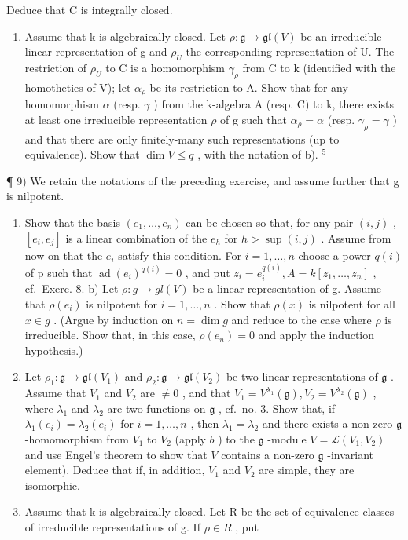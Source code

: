 Deduce that C is integrally closed.

\begin{enumerate}
\def\labelenumi{\alph{enumi})}
\setcounter{enumi}{3}
\tightlist
\item
  Assume that k is algebraically closed. Let \(\rho: \mathfrak{g} \to \mathfrak{gl}(V)\) be an irreducible linear representation of g and \(\rho_{U}\) the corresponding representation of U. The restriction of \(\rho_{U}\) to C is a homomorphism \(\gamma_{\rho}\) from C to k (identified with the homotheties of V); let \(\alpha_{\rho}\) be its restriction to A. Show that for any homomorphism \(\alpha\) (resp. \(\gamma\) ) from the k-algebra A (resp. C) to k, there exists at least one irreducible representation \(\rho\) of g such that \(\alpha_{\rho} = \alpha\) (resp. \(\gamma_{\rho} = \gamma\) ) and that there are only finitely-many such representations (up to equivalence). Show that \(\dim V \leq q\) , with the notation of b). \(^{5}\)
\end{enumerate}

¶ 9) We retain the notations of the preceding exercise, and assume further that g is nilpotent.

\begin{enumerate}
\def\labelenumi{\alph{enumi})}
\item
  Show that the basis \((e_{1},\ldots,e_{n})\) can be chosen so that, for any pair \((i,j)\) , \([e_{i},e_{j}]\) is a linear combination of the \(e_{h}\) for \(h > \sup(i,j)\) . Assume from now on that the \(e_{i}\) satisfy this condition. For \(i=1,\ldots,n\) choose a power \(q(i)\) of p such that \(\operatorname{ad}(e_{i})^{q(i)} = 0\) , and put \(z_{i} = e_{i}^{q(i)}, A = k[z_{1},\ldots,z_{n}]\) , cf.~Exerc. 8. b) Let \(\rho : g \to gl(V)\) be a linear representation of g. Assume that \(\rho(e_{i})\) is nilpotent for \(i = 1,\ldots,n\) . Show that \(\rho(x)\) is nilpotent for all \(x \in g\) . (Argue by induction on \(n = \dim g\) and reduce to the case where \(\rho\) is irreducible. Show that, in this case, \(\rho(e_{n}) = 0\) and apply the induction hypothesis.)
\item
  Let \(\rho_1: \mathfrak{g} \to \mathfrak{gl}(V_1)\) and \(\rho_2: \mathfrak{g} \to \mathfrak{gl}(V_2)\) be two linear representations of \(\mathfrak{g}\) . Assume that \(V_1\) and \(V_2\) are \(\neq 0\) , and that \(V_1 = V^{\lambda_1}(\mathfrak{g}), V_2 = V^{\lambda_2}(\mathfrak{g})\) , where \(\lambda_1\) and \(\lambda_2\) are two functions on \(\mathfrak{g}\) , cf.~no. 3. Show that, if \(\lambda_1(e_i) = \lambda_2(e_i)\) for \(i = 1, \ldots, n\) , then \(\lambda_1 = \lambda_2\) and there exists a non-zero \(\mathfrak{g}\) -homomorphism from \(V_1\) to \(V_2\) (apply \(b\) ) to the \(\mathfrak{g}\) -module \(V = \mathcal{L}(V_1, V_2)\) and use Engel's theorem to show that \(V\) contains a non-zero \(\mathfrak{g}\) -invariant element). Deduce that if, in addition, \(V_1\) and \(V_2\) are simple, they are isomorphic.
\item
  Assume that k is algebraically closed. Let R be the set of equivalence classes of irreducible representations of g. If \(\rho \in R\) , put
\end{enumerate}

